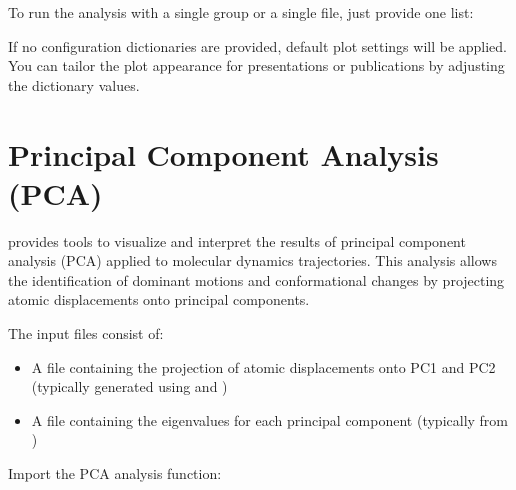 \documentclass[a4paper,10pt,english]{sphinxmanual}
\begin{document}
\sphinxAtStartPar
To run the analysis with a single group or a single file, just provide one list:

\begin{sphinxVerbatim}[commandchars=\\\{\}]
 
\end{sphinxVerbatim}

\sphinxAtStartPar
If no configuration dictionaries are provided, default plot settings will be applied. You can tailor the plot appearance for presentations or publications by adjusting the dictionary values.


\section{Principal Component Analysis (PCA)}
\label{\detokenize{Input:principal-component-analysis-pca}}
\sphinxAtStartPar
{} provides tools to visualize and interpret the results of principal component analysis (PCA) applied to molecular dynamics trajectories. This analysis allows the identification of dominant motions and conformational changes by projecting atomic displacements onto principal components.

\sphinxAtStartPar
The input files consist of:
\begin{itemize}
\item {} 
\sphinxAtStartPar
A  file containing the projection of atomic displacements onto PC1 and PC2 (typically generated using  and )

\item {} 
\sphinxAtStartPar
A  file containing the eigenvalues for each principal component (typically  from )

\end{itemize}

\sphinxAtStartPar
{}

\sphinxAtStartPar
Import the PCA analysis function:

\begin{sphinxVerbatim}[commandchars=\\\{\}]
 
\end{sphinxVerbatim}
\end{document}
